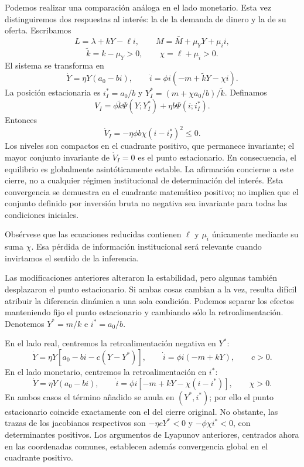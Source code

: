 \documentclass[10.5pt,twoside]{article}
\newcounter{rsec}
\newcommand{\rsection}{%
  \refstepcounter{rsec}%
  \par\vspace{1.35em}%
  \begin{center}\fontsize{14}{16}\selectfont\Roman{rsec}\end{center}%
  \vspace{0.35em}%
}
\begin{document}
Podemos realizar una comparación análoga en el lado monetario. Esta vez distinguiremos dos respuestas al interés: la de la demanda de dinero y la de su oferta. Escribamos
\[
 L=\lambda+kY-\ell i,\qquad
 M=\bar M+\mu_Y Y+\mu_i i,
\]
\[
 \widetilde k=k-\mu_Y>0,\qquad \chi=\ell+\mu_i>0.
\]
El sistema se transforma en
\[
 \mathord{\dot Y=\eta Y(a_0-bi),\qquad
 \dot i=\phi i(-m+\widetilde kY-\chi i).}
\]
La posición estacionaria es $i_I^*=a_0/b$ y $Y_I^*=(m+\chi a_0/b)/\widetilde k$. Definamos
\[
 V_I=\phi\widetilde k\Psi(Y;Y_I^*)
 +\eta b\Psi(i;i_I^*).
\]
Entonces
\[
 \mathord{\dot V_I=-\eta\phi b\chi(i-i_I^*)^2\leq0.}
\]
Los niveles son compactos en el cuadrante positivo, que permanece invariante; el mayor conjunto invariante de $\dot V_I=0$ es el punto estacionario. En consecuencia, el equilibrio es globalmente asintóticamente estable. La afirmación concierne a este cierre, no a cualquier régimen institucional de determinación del interés. Esta convergencia se demuestra en el cuadrante matemático positivo; no implica que el conjunto definido por inversión bruta no negativa sea invariante para todas las condiciones iniciales.

Obsérvese que las ecuaciones reducidas contienen $\ell$ y $\mu_i$ únicamente mediante su suma $\chi$. Esa pérdida de información institucional será relevante cuando invirtamos el sentido de la inferencia.

\rsection
Las modificaciones anteriores alteraron la estabilidad, pero algunas también desplazaron el punto estacionario. Si ambas cosas cambian a la vez, resulta difícil atribuir la diferencia dinámica a una sola condición. Podemos separar los efectos manteniendo fijo el punto estacionario y cambiando sólo la retroalimentación. Denotemos $Y^*=m/k$ e $i^*=a_0/b$.

En el lado real, centremos la retroalimentación negativa en $Y^*$:
\[
 \mathord{\dot Y=\eta Y[a_0-bi-c(Y-Y^*)],\qquad
 \dot i=\phi i(-m+kY),\qquad c>0.}
\]
En el lado monetario, centremos la retroalimentación en $i^*$:
\[
 \mathord{\dot Y=\eta Y(a_0-bi),\qquad
 \dot i=\phi i[-m+kY-\chi(i-i^*)],\qquad\chi>0.}
\]
En ambos casos el término añadido se anula en $(Y^*,i^*)$; por ello el punto estacionario coincide exactamente con el del cierre original. No obstante, las trazas de los jacobianos respectivos son $-\eta cY^*<0$ y $-\phi\chi i^*<0$, con determinantes positivos. Los argumentos de Lyapunov anteriores, centrados ahora en las coordenadas comunes, establecen además convergencia global en el cuadrante positivo.
\end{document}
